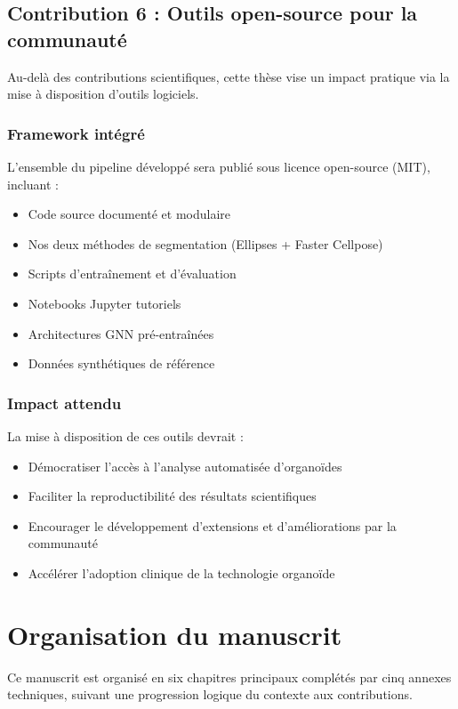 \subsection{Contribution 6 : Outils open-source pour la communauté}

Au-delà des contributions scientifiques, cette thèse vise un impact pratique via la mise à disposition d'outils logiciels.

\subsubsection{Framework intégré}

L'ensemble du pipeline développé sera publié sous licence open-source (MIT), incluant :
\begin{itemize}
    \item Code source documenté et modulaire 
    \item Nos deux méthodes de segmentation (Ellipses + Faster Cellpose)
    \item Scripts d'entraînement et d'évaluation
    \item Notebooks Jupyter tutoriels
    \item Architectures GNN pré-entraînées
    \item Données synthétiques de référence
\end{itemize}

\subsubsection{Impact attendu}

La mise à disposition de ces outils devrait :
\begin{itemize}
    \item Démocratiser l'accès à l'analyse automatisée d'organoïdes
    \item Faciliter la reproductibilité des résultats scientifiques
    \item Encourager le développement d'extensions et d'améliorations par la communauté
    \item Accélérer l'adoption clinique de la technologie organoïde
\end{itemize}

\section{Organisation du manuscrit}

Ce manuscrit est organisé en six chapitres principaux complétés par cinq annexes techniques, suivant une progression logique du contexte aux contributions.

